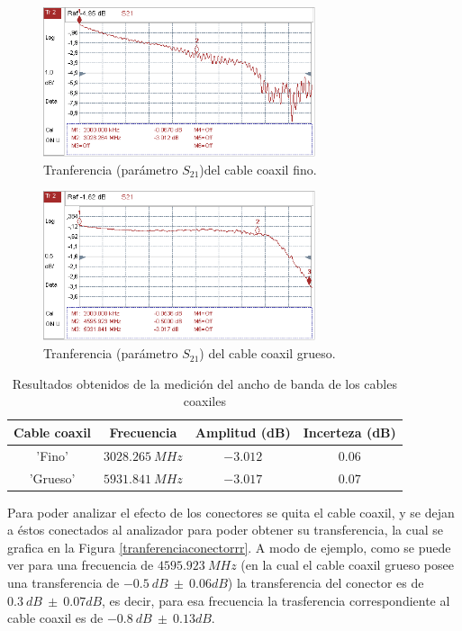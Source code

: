 \documentclass[a4paper,10pt]{article}
\begin{document}
		\begin{figure}[!htb]
			\centering
			\includegraphics[width=8cm]
			{Imagenes/transferenciacablefino.png}
			\caption{Tranferencia (par\'ametro $S_{21}$)del cable coaxil 
			fino.}
			\label{caoxilflaco} 
		\end{figure}
		

		\begin{figure}[!htb]
			\centering
			\includegraphics[width=8cm]
			{Imagenes/transferenciacablegroso.png}
			\caption{Tranferencia (par\'ametro $S_{21}$) del cable coaxil 
			grueso.}
			\label{coaxilgordo} 
		\end{figure}
		
	\begin{table}[!htp]
			\centering
			\begin{tabular}{|c|c|c|c|}
				\hline
			Cable coaxil	& Frecuencia & Amplitud (dB) & Incerteza (dB)\\
				\hline
			'Fino'	 &$3028.265~MHz$ & $-3.012$ & $0.06$ \\
			'Grueso' &$5931.841~MHz$ & $-3.017$ & $0.07$ \\				
			\end{tabular}
			\caption{Resultados obtenidos de la medici\'on del ancho de banda de los cables coaxiles} \label{puta}
		\end{table}	
		
		\indent Para poder analizar el efecto de los conectores se quita el 
		cable coaxil, y se dejan a \'estos conectados al analizador para poder 
		obtener su transferencia, la cual se grafica en la Figura 
		\ref{tranferenciaconectorrr}. A modo de ejemplo, como se puede ver para una frecuencia de $4595.923~MHz$ (en la cual el cable coaxil grueso posee una transferencia de $-0.5~dB~\pm~0.06dB$) la transferencia del conector es de $0.3~dB~\pm~0.07dB$, es decir, para esa frecuencia la trasferencia correspondiente al cable coaxil es de $-0.8~dB~\pm~0.13dB$. 
		
\end{document}
